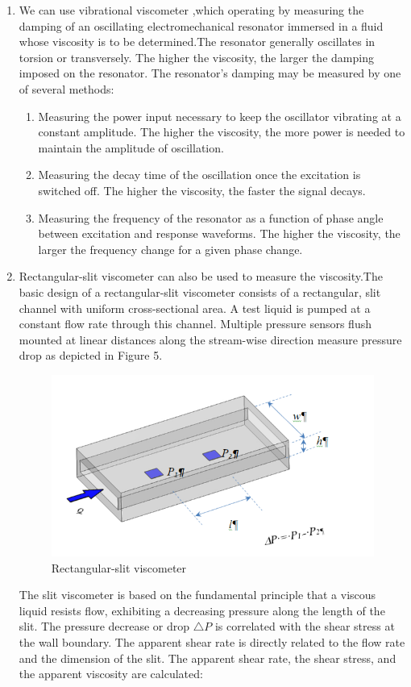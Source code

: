 \documentclass[12pt]{article}
\begin{document}
\begin{enumerate}
\item We can use vibrational viscometer ,which operating by measuring the damping of an oscillating electromechanical resonator immersed in a fluid whose viscosity is to be determined.The resonator generally oscillates in torsion or transversely. The higher the viscosity, the larger the damping imposed on the resonator. The resonator's damping may be measured by one of several methods:
\begin{enumerate}[(1)]
\item Measuring the power input necessary to keep the oscillator vibrating at a constant amplitude. The higher the viscosity, the more power is needed to maintain the amplitude of oscillation.
\item Measuring the decay time of the oscillation once the excitation is switched off. The higher the viscosity, the faster the signal decays.
\item Measuring the frequency of the resonator as a function of phase angle between excitation and response waveforms. The higher the viscosity, the larger the frequency change for a given phase change.
\end{enumerate}
\item Rectangular-slit viscometer can also be used to measure the viscosity.The basic design of a rectangular-slit viscometer consists of a rectangular, slit channel with uniform cross-sectional area. A test liquid is pumped at a constant flow rate through this channel. Multiple pressure sensors flush mounted at linear distances along the stream-wise direction measure pressure drop as depicted in Figure 5.
\begin{figure}[H]
\centering
\includegraphics{P5.jpg}
\caption{Rectangular-slit viscometer}
\end{figure}
The slit viscometer is based on the fundamental principle that a viscous liquid resists flow, exhibiting a decreasing pressure along the length of the slit. The pressure decrease or drop $\bigtriangleup{P}$ is correlated with the shear stress at the wall boundary. The apparent shear rate is directly related to the flow rate and the dimension of the slit. The apparent shear rate, the shear stress, and the apparent viscosity are calculated:

\end{enumerate}
\end{document}
